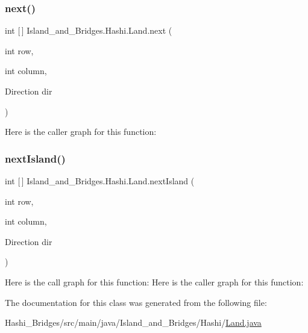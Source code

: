 \subsubsection{\texorpdfstring{next()}{next()}}
{\footnotesize\ttfamily int \mbox{[}$\,$\mbox{]} Island\+\_\+and\+\_\+\+Bridges.\+Hashi.\+Land.\+next (\begin{DoxyParamCaption}\item[{int}]{row,  }\item[{int}]{column,  }\item[{Direction}]{dir }\end{DoxyParamCaption})}

Here is the caller graph for this function\+:
\mbox{\label{class_island__and___bridges_1_1_hashi_1_1_land_a0a24f0dc5ed35f61803817ae39e274d9}} 
\subsubsection{\texorpdfstring{next\+Island()}{nextIsland()}}
{\footnotesize\ttfamily int \mbox{[}$\,$\mbox{]} Island\+\_\+and\+\_\+\+Bridges.\+Hashi.\+Land.\+next\+Island (\begin{DoxyParamCaption}\item[{int}]{row,  }\item[{int}]{column,  }\item[{Direction}]{dir }\end{DoxyParamCaption})}

Here is the call graph for this function\+:
Here is the caller graph for this function\+:


The documentation for this class was generated from the following file\+:\begin{DoxyCompactItemize}
\item 
Hashi\+\_\+\+Bridges/src/main/java/\+Island\+\_\+and\+\_\+\+Bridges/\+Hashi/\mbox{\hyperlink{_land_8java}{Land.\+java}}\end{DoxyCompactItemize}
